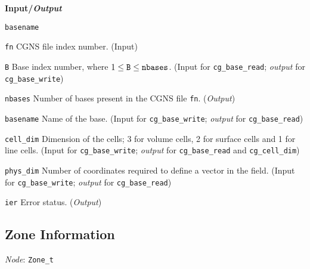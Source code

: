 \noindent
\textbf{\textcolor{input}{Input}/\textcolor{output}{\textit{Output}}}

\begin{Ventryi}{\texttt{basename}}\raggedright
\item [\texttt{fn}]
      CGNS file index number.
      (\textcolor{input}{Input})
\item [\texttt{B}]
      Base index number, where $1 \leq \text{\texttt{B}} \leq \text{\texttt{nbases}}$.
      (\textcolor{input}{Input} for \texttt{cg\_base\_read};
      \textcolor{output}{\textit{output}} for \texttt{cg\_base\_write})
\item [\texttt{nbases}]
      Number of bases present in the CGNS file \texttt{fn}.
      (\textcolor{output}{\textit{Output}})
\item [\texttt{basename}]
      Name of the base.
      (\textcolor{input}{Input} for \texttt{cg\_base\_write};
      \textcolor{output}{\textit{output}} for \texttt{cg\_base\_read})
\item [\texttt{cell\_dim}]
      Dimension of the cells; 3 for volume cells, 2 for surface cells
      and 1 for line cells.
      (\textcolor{input}{Input} for \texttt{cg\_base\_write};
      \textcolor{output}{\textit{output}} for \texttt{cg\_base\_read}
      and \texttt{cg\_cell\_dim})
\item [\texttt{phys\_dim}]
      Number of coordinates required to define a vector in the field.
      (\textcolor{input}{Input} for \texttt{cg\_base\_write};
      \textcolor{output}{\textit{output}} for \texttt{cg\_base\_read})
\item [\texttt{ier}]
      Error status.
      (\textcolor{output}{\textit{Output}})
\end{Ventryi}

\newpage
\subsection{Zone Information}
\label{s:zone}

\noindent
\textit{Node}: \texttt{Zone\_t}

